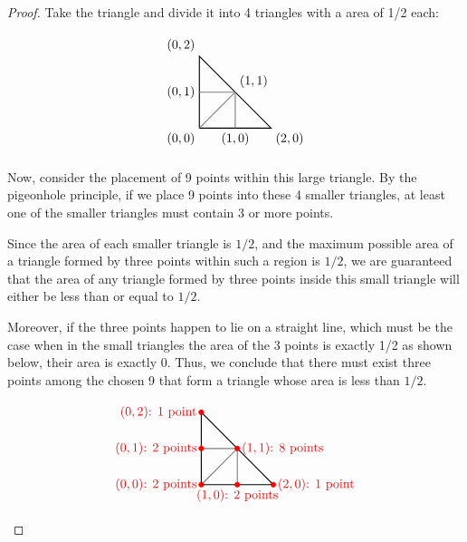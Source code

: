 \documentclass{article}
\begin{document}
\begin{proof}
    Take the triangle and divide it into 4 triangles with a area of 1/2 each:

   \[
\begin{tikzpicture}
    \draw[thick] (0,0) -- (0,2) -- (2,0) -- cycle;
    
    \draw[thick, gray] (0,1) -- (1,1); 
    \draw[thick, gray] (1,0) -- (1,1); 
    \draw[thick, gray] (0,0) -- (1,1); 
    
    \node[below left] at (0,0) {$(0,0)$};
    \node[above left] at (0,2) {$(0,2)$};
    \node[below right] at (2,0) {$(2,0)$};
    \node[above right] at (1,1) {$(1,1)$};
    \node[below] at (1,0) {$(1,0)$};
    \node[left] at (0,1) {$(0,1)$};
\end{tikzpicture}
\]

   Now, consider the placement of 9 points within this large triangle. By the pigeonhole principle, if we place 9 points into these 4 smaller triangles, at least one of the smaller triangles must contain 3 or more points.

Since the area of each smaller triangle is $1/2$, and the maximum possible area of a triangle formed by three points within such a region is $1/2$, we are guaranteed that the area of any triangle formed by three points inside this small triangle will either be less than or equal to $1/2$.

Moreover, if the three points happen to lie on a straight line, which must be the case when in the small triangles the area of the 3 points is exactly 1/2 as shown below, their area is exactly 0.
Thus, we conclude that there must exist three points among the chosen 9 that form a triangle whose area is less than $1/2$.

    \[
    \begin{tikzpicture}
    \draw[thick] (0,0) -- (0,2) -- (2,0) -- cycle;
    
    \draw[thick, gray] (0,1) -- (1,1); 
    \draw[thick, gray] (1,0) -- (1,1); 
    \draw[thick, gray] (0,0) -- (1,1); 
    
    \filldraw[red] (0,1) circle (2pt) node[left] {$(0,1)$: 2 points};
    \filldraw[red] (1,1) circle (2pt) node[right] {$(1,1)$: 8 points};
    \filldraw[red] (0,0) circle (2pt) node[left] {$(0,0)$: 2 points};
    \filldraw[red] (0,2) circle (2pt) node[left] {$(0,2)$: 1 point};
    \filldraw[red] (1,0) circle (2pt) node[below] {$(1,0)$: 2 points};
    \filldraw[red] (2,0) circle (2pt) node[right] {$(2,0)$: 1 point};
    
\end{tikzpicture}
\]

\end{proof}
\end{document}
